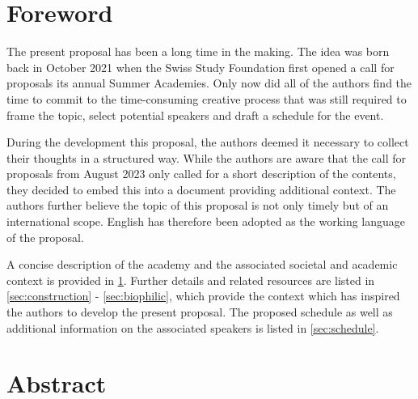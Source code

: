 \documentclass{article}
\begin{document}
\section*{\centering Foreword}

The present proposal has been a long time in the making. The idea was born back in October 2021 when the Swiss Study Foundation first opened a call for proposals its annual Summer Academies. Only now did all of the authors find the time to commit to the time-consuming creative process that was still required to frame the topic, select potential speakers and draft a schedule for the event.

During the development this proposal, the authors deemed it necessary to collect their thoughts in a structured way. While the authors are aware that the call for proposals from August 2023 only called for a short description of the contents, they decided to embed this into a document providing additional context. The authors further believe the topic of this proposal is not only timely but of an international scope. English has therefore been adopted as the working language of the proposal.

A concise description of the academy and the associated societal and academic context is provided in \cref{sec:abstract}. Further details and related resources are listed in \cref{sec:construction} - \cref{sec:biophilic}, which provide the context which has inspired the authors to develop the present proposal. The proposed schedule as well as additional information on the associated speakers is listed in \cref{sec:schedule}. 

\clearpage
\section{\centering Abstract}
\label{sec:abstract}
\end{document}
